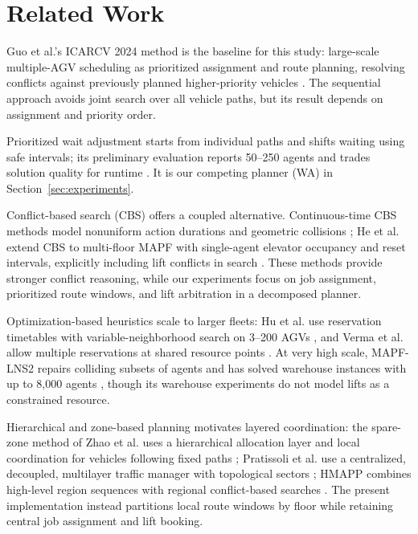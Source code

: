\section{Related Work}
\label{sec:related}

Guo et al.'s ICARCV 2024 method is the baseline for this study: large-scale multiple-AGV scheduling as prioritized assignment and route planning, resolving conflicts against previously planned higher-priority vehicles \cite{guo2024}. The sequential approach avoids joint search over all vehicle paths, but its result depends on assignment and priority order.

Prioritized wait adjustment starts from individual paths and shifts waiting using safe intervals; its preliminary evaluation reports 50--250 agents and trades solution quality for runtime \cite{andreychuk2018}. It is our competing planner (WA) in Section~\ref{sec:experiments}.

Conflict-based search (CBS) offers a coupled alternative. Continuous-time CBS methods model nonuniform action durations and geometric collisions \cite{andreychuk2022}; He et al. extend CBS to multi-floor MAPF with single-agent elevator occupancy and reset intervals, explicitly including lift conflicts in search \cite{he2026}. These methods provide stronger conflict reasoning, while our experiments focus on job assignment, prioritized route windows, and lift arbitration in a decomposed planner.

Optimization-based heuristics scale to larger fleets: Hu et al. use reservation timetables with variable-neighborhood search on 3--200 AGVs \cite{hu2022}, and Verma et al. allow multiple reservations at shared resource points \cite{verma2024}. At very high scale, MAPF-LNS2 repairs colliding subsets of agents and has solved warehouse instances with up to 8,000 agents \cite{mapflns2022}, though its warehouse experiments do not model lifts as a constrained resource.

Hierarchical and zone-based planning motivates layered coordination: the spare-zone method of Zhao et al. uses a hierarchical allocation layer and local coordination for vehicles following fixed paths \cite{zhao2021}; Pratissoli et al. use a centralized, decoupled, multilayer traffic manager with topological sectors \cite{pratissoli2024}; HMAPP combines high-level region sequences with regional conflict-based searches \cite{hmapp2021}. The present implementation instead partitions local route windows by floor while retaining central job assignment and lift booking.
